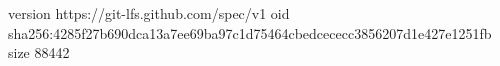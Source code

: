 version https://git-lfs.github.com/spec/v1
oid sha256:4285f27b690dca13a7ee69ba97c1d75464cbedcececc3856207d1e427e1251fb
size 88442
